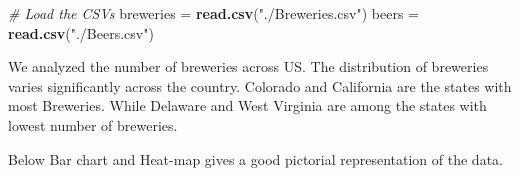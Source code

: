 \documentclass[]{article}
\newenvironment{Shaded}{\begin{snugshade}}{\end{snugshade}}
\newcommand{\CommentTok}[1]{\textcolor[rgb]{0.56,0.35,0.01}{\textit{#1}}}
\newcommand{\DataTypeTok}[1]{\textcolor[rgb]{0.13,0.29,0.53}{#1}}
\newcommand{\DecValTok}[1]{\textcolor[rgb]{0.00,0.00,0.81}{#1}}
\newcommand{\FloatTok}[1]{\textcolor[rgb]{0.00,0.00,0.81}{#1}}
\newcommand{\KeywordTok}[1]{\textcolor[rgb]{0.13,0.29,0.53}{\textbf{#1}}}
\newcommand{\NormalTok}[1]{#1}
\newcommand{\OperatorTok}[1]{\textcolor[rgb]{0.81,0.36,0.00}{\textbf{#1}}}
\newcommand{\StringTok}[1]{\textcolor[rgb]{0.31,0.60,0.02}{#1}}
\begin{document}
\begin{Shaded}
\begin{Highlighting}[]
\CommentTok{# Load the CSVs}
\NormalTok{breweries =}\StringTok{ }\KeywordTok{read.csv}\NormalTok{(}\StringTok{"./Breweries.csv"}\NormalTok{)}
\NormalTok{beers =}\StringTok{ }\KeywordTok{read.csv}\NormalTok{(}\StringTok{"./Beers.csv"}\NormalTok{)}
\end{Highlighting}
\end{Shaded}

We analyzed the number of breweries across US. The distribution of
breweries varies significantly across the country. Colorado and
California are the states with most Breweries. While Delaware and West
Virginia are among the states with lowest number of breweries.

Below Bar chart and Heat-map gives a good pictorial representation of
the data.

\begin{Shaded}
\end{Shaded}
\end{document}
